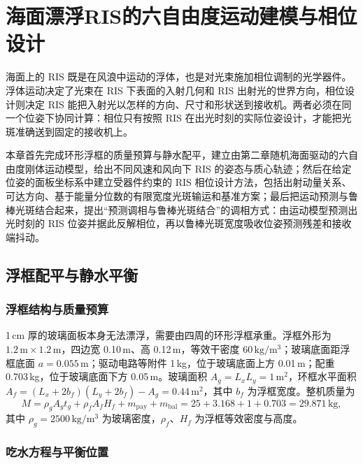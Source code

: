 \chapter{海面漂浮RIS的六自由度运动建模与相位设计}
\label{chap:ris_motion}

海面上的 RIS 既是在风浪中运动的浮体，也是对光束施加相位调制的光学器件。浮体运动决定了光束在 RIS 下表面的入射几何和 RIS 出射光的世界方向，相位设计则决定 RIS 能把入射光以怎样的方向、尺寸和形状送到接收机。两者必须在同一个位姿下协同计算：相位只有按照 RIS 在出光时刻的实际位姿设计，才能把光斑准确送到固定的接收机上。

本章首先完成环形浮框的质量预算与静水配平，建立由第二章随机海面驱动的六自由度刚体运动模型，给出不同风速和风向下 RIS 的姿态与质心轨迹；然后在给定位姿的面板坐标系中建立受器件约束的 RIS 相位设计方法，包括出射动量关系、可达方向、基于能量分位数的有限宽度光斑输运和基准方案；最后把运动预测与鲁棒光斑结合起来，提出“预测调相与鲁棒光斑结合”的调相方式：由运动模型预测出光时刻的 RIS 位姿并据此反解相位，再以鲁棒光斑宽度吸收位姿预测残差和接收端抖动。

\section{浮框配平与静水平衡}
\label{sec:c3_float}

\subsection{浮框结构与质量预算}

1\,cm 厚的玻璃面板本身无法漂浮，需要由四周的环形浮框承重。浮框外形为 $1.2\,\mathrm{m}\times1.2\,\mathrm{m}$，四边宽 0.10\,m、高 0.12\,m，等效干密度 60\,$\mathrm{kg/m^3}$；玻璃底面距浮框底面 $a=0.055\,\mathrm{m}$；驱动电路等附件 1\,kg，位于玻璃底面上方 0.01\,m；配重 0.703\,kg，位于玻璃底面下方 0.05\,m。玻璃面积 $A_g=L_xL_y=1\,\mathrm{m^2}$，环框水平面积 $A_f=(L_x+2b_f)(L_y+2b_f)-A_g=0.44\,\mathrm{m^2}$，其中 $b_f$ 为浮框宽度。整机质量为
\begin{equation}
M=\rho_gA_gt_g+\rho_fA_fH_f+m_{\mathrm{pay}}+m_{\mathrm{bal}}
=25+3.168+1+0.703=29.871\,\mathrm{kg},
\label{eq:c3_mass}
\end{equation}
其中 $\rho_g=2500\,\mathrm{kg/m^3}$ 为玻璃密度，$\rho_f$、$H_f$ 为浮框等效密度与高度。

\subsection{吃水方程与平衡位置}

